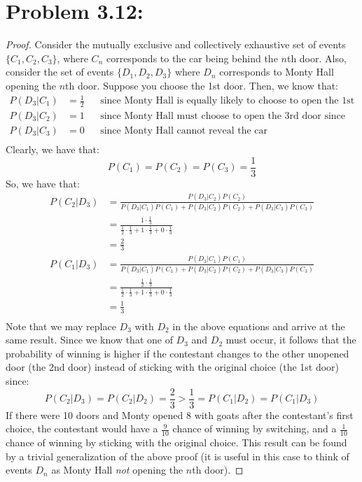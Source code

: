 \documentclass{article}
\begin{document}
\section*{Problem 3.12:}
\begin{proof}
Consider the mutually exclusive and collectively exhaustive set of events $\{C_1, C_2, C_3\}$, where $C_n$ corresponds to the car being behind the $n$th door.
Also, consider the set of events $\{D_1, D_2, D_3\}$ where $D_n$ corresponds to Monty Hall opening the $n$th door.
Suppose you choose the 1st door. Then, we know that:
\begin{align*}
P(D_3 | C_1) &= \frac{1}{2} &&\text{since Monty Hall is equally likely to choose to open the 1st or the 2nd door} \\
P(D_3 | C_2) &= 1 &&\text{since Monty Hall must choose to open the 3rd door since you have chosen the 1st door} \\
P(D_3 | C_3) &= 0 &&\text{since Monty Hall cannot reveal the car} \\
\end{align*}
Clearly, we have that:
$$P(C_1) = P(C_2) = P(C_3) = \frac{1}{3}$$
So, we have that:
\begin{align*}
P(C_2 | D_3) &= \frac{P(D_3 | C_2) P(C_2)}{P(D_3 | C_1) P(C_1) + P(D_3 | C_2) P(C_2) + P(D_3 | C_3) P(C_3)} \\
&= \frac{1 \cdot \frac{1}{3}}{\frac{1}{2} \cdot \frac{1}{3} + 1 \cdot \frac{1}{3} + 0 \cdot \frac{1}{3}} \\
&= \frac{2}{3} \\
P(C_1 | D_3) &= \frac{P(D_3 | C_1) P(C_1)}{P(D_3 | C_1) P(C_1) + P(D_3 | C_2) P(C_2) + P(D_3 | C_3) P(C_3)} \\
&= \frac{\frac{1}{2} \cdot \frac{1}{3}}{\frac{1}{2} \cdot \frac{1}{3} + 1 \cdot \frac{1}{3} + 0 \cdot \frac{1}{3}} \\
&= \frac{1}{3} \\
\end{align*}
Note that we may replace $D_3$ with $D_2$ in the above equations and arrive at the same result. Since we know that one of $D_3$ and $D_2$ must occur, it follows that the probability of winning is higher if the contestant changes to the other unopened door (the 2nd door) instead of sticking with the original choice (the 1st door) since:
$$P(C_2 | D_3) = P(C_2 | D_2) = \frac{2}{3} > \frac{1}{3} = P(C_1 | D_2) = P(C_1 | D_3)$$
If there were 10 doors and Monty opened 8 with goats after the contestant's first choice, the contestant would have a $\frac{9}{10}$ chance of winning by switching, and a $\frac{1}{10}$ chance of winning by sticking with the original choice. This result can be found by a trivial generalization of the above proof (it is useful in this case to think of events $D_n$ as Monty Hall {\it not} opening the $n$th door).
\end{proof}
\end{document}
